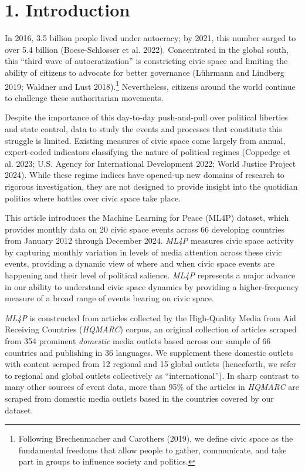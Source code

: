 \documentclass[
  letterpaper,
  DIV=11,
  numbers=noendperiod]{scrartcl}
\begin{document}
\hypertarget{introduction}{%
\section{1. Introduction}\label{introduction}}

In 2016, 3.5 billion people lived under autocracy; by 2021, this number
surged to over 5.4 billion (Boese-Schlosser et al. 2022). Concentrated
in the global south, this ``third wave of autocratization'' is
constricting civic space and limiting the ability of citizens to
advocate for better governance (Lührmann and Lindberg 2019; Waldner and
Lust 2018).\footnote{Following Brechenmacher and Carothers (2019), we
  define civic space as the fundamental freedoms that allow people to
  gather, communicate, and take part in groups to influence society and
  politics.} Nevertheless, citizens around the world continue to
challenge these authoritarian movements.

Despite the importance of this day-to-day push-and-pull over political
liberties and state control, data to study the events and processes that
constitute this struggle is limited. Existing measures of civic space
come largely from annual, expert-coded indicators classifying the nature
of political regimes (Coppedge et al. 2023; U.S. Agency for
International Development 2022; World Justice Project 2024). While these
regime indices have opened-up new domains of research to rigorous
investigation, they are not designed to provide insight into the
quotidian politics where battles over civic space take place.

This article introduces the Machine Learning for Peace (ML4P) dataset,
which provides monthly data on 20 civic space events across 66
developing countries from January 2012 through December 2024.
\emph{ML4P} measures civic space activity by capturing monthly variation
in levels of media attention across these civic events, providing a
dynamic view of where and when civic space events are happening and
their level of political salience. \emph{ML4P} represents a major
advance in our ability to understand civic space dynamics by providing a
higher-frequency measure of a broad range of events bearing on civic
space.

\emph{ML4P} is constructed from articles collected by the High-Quality
Media from Aid Receiving Countries (\emph{HQMARC}) corpus, an original
collection of articles scraped from 354 prominent \emph{domestic} media
outlets based across our sample of 66 countries and publishing in 36
languages. We supplement these domestic outlets with content scraped
from 12 regional and 15 global outlets (henceforth, we refer to regional
and global outlets collectively as ``international''). In sharp contrast
to many other sources of event data, more than 95\% of the articles in
\emph{HQMARC} are scraped from domestic media outlets based in the
countries covered by our dataset.
\end{document}
